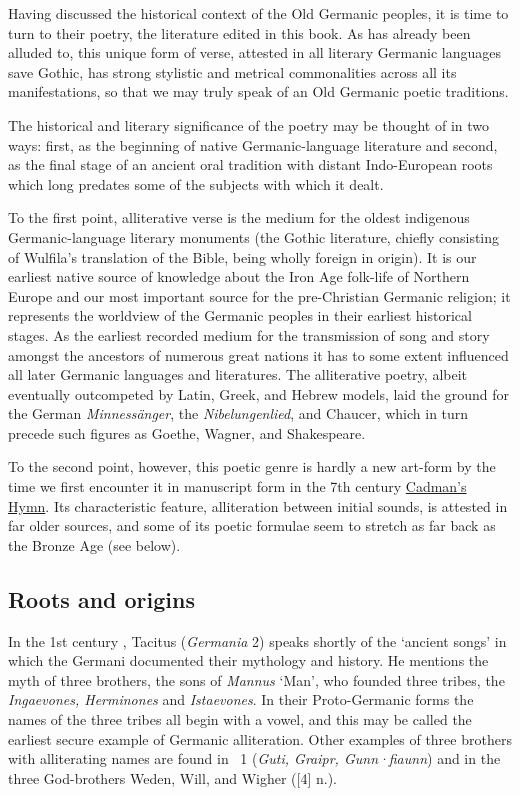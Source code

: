   Having discussed the historical context of the Old Germanic peoples, it is time to turn to their poetry, the literature edited in this book.  As has already been alluded to, this unique form of verse, attested in all literary Germanic languages save Gothic, has strong stylistic and metrical commonalities across all its manifestations, so that we may truly speak of an Old Germanic poetic traditions.

  The historical and literary significance of the poetry may be thought of in two ways: first, as the beginning of native Germanic-language literature and second, as the final stage of an ancient oral tradition with distant Indo-European roots which long predates some of the subjects with which it dealt.

  To the first point, alliterative verse is the medium for the oldest indigenous Germanic-language literary monuments (the Gothic literature, chiefly consisting of Wulfila’s translation of the Bible, being wholly foreign in origin).  It is our earliest native source of knowledge about the Iron Age folk-life of Northern Europe and our most important source for the pre-Christian Germanic religion; it represents the worldview of the Germanic peoples in their earliest historical stages.  As the earliest recorded medium for the transmission of song and story amongst the ancestors of numerous great nations it has to some extent influenced all later Germanic languages and literatures.  The alliterative poetry, albeit eventually outcompeted by Latin, Greek, and Hebrew models, laid the ground for the German \emph{Minnessänger}, the \emph{Nibelungenlied}, and Chaucer, which in turn precede such figures as Goethe, Wagner, and Shakespeare.

  To the second point, however, this poetic genre is hardly a new art-form by the time we first encounter it in manuscript form in the 7th century \hyperref[Cadman]{Cadman’s Hymn}.  Its characteristic feature, alliteration between initial sounds, is attested in far older sources, and some of its poetic formulae seem to stretch as far back as the Bronze Age (see below).

  \subsection{Roots and origins}

  In the 1st century \ce, Tacitus (\emph{Germania} 2) speaks shortly of the ‘ancient songs’ in which the Germani documented their mythology and history.  He mentions the myth of three brothers, the sons of \emph{Mannus} ‘Man’, who founded three tribes, the \emph{Ingaevones, Herminones} and \emph{Istaevones}.  In their Proto-Germanic forms the names of the three tribes all begin with a vowel, and this may be called the earliest secure example of Germanic alliteration.  Other examples of three brothers with alliterating names are found in \Gutasaga\ 1 (\emph{Guti, Graipr, Gunn·fiaunn}) and in the three God-brothers Weden, Will, and Wigher ([4] n.).

